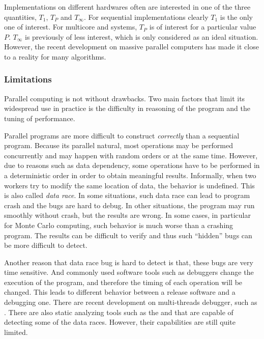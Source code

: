 Implementations on different hardwares often are interested in one of the
three quantities, $T_1$, $T_P$ and $T_{\infty}$. For sequential
implementations clearly $T_1$ is the only one of interest. For multicore and
\smp systems, $T_P$ is of interest for a particular value $P$. $T_{\infty}$ is
previously of less interest, which is only considered as an ideal situation.
However, the recent development on massive parallel computers has made it
close to a reality for many algorithms.

\subsubsection{Limitations}
\label{ssub:Limitations}

Parallel computing is not without drawbacks. Two main factors that limit its
widespread use in practice is the difficulty in reasoning of the program and
the tuning of performance.

Parallel programs are more difficult to construct \emph{correctly} than a
sequential program. Because its parallel natural, most operations may be
performed concurrently and may happen with random orders or at the same time.
However, due to reasons such as data dependency, some operations have to be
performed in a deterministic order in order to obtain meaningful results.
Informally, when two workers try to modify the same location of data, the
behavior is undefined. This is also called \emph{data race}. In some
situations, such data race can lead to program crash and the bugs are hard to
debug. In other situations, the program may run smoothly without crash, but
the results are wrong. In some cases, in particular for Monte Carlo computing,
such behavior is much worse than a crashing program. The results can be
difficult to verify and thus such ``hidden'' bugs can be more difficult to
detect.

Another reason that data race bug is hard to detect is that, these bugs are
very time sensitive. And commonly used software tools such as debuggers change
the execution of the program, and therefore the timing of each operation will
be changed. This leads to different behavior between a release software and a
debugging one. There are recent development on multi-threads debugger, such as
\lldb. There are also static analyzing tools such as the \clangstatic and
\inspector that are capable of detecting some of the data races. However,
their capabilities are still quite limited.

